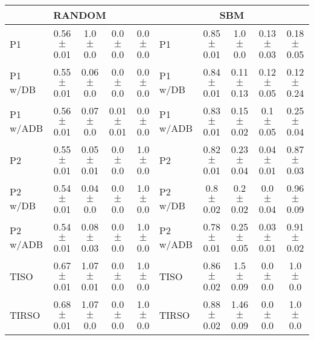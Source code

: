\begin{table*}[htbp]
\begin{tabular}{lcccc|lcccc}
\midrule
\multicolumn{5}{c}{\textbf{RANDOM}} & \multicolumn{5}{c}{\textbf{SBM}} \\
\midrule
P1 & 0.56{\tiny$\pm$0.01} & 1.0{\tiny$\pm$0.0} & 0.0{\tiny$\pm$0.0} & 0.0{\tiny$\pm$0.0}  & P1 & 0.85{\tiny$\pm$0.01} & 1.0{\tiny$\pm$0.0} & 0.13{\tiny$\pm$0.03} & 0.18{\tiny$\pm$0.05}  \\
P1 w/DB & 0.55{\tiny$\pm$0.01} & 0.06{\tiny$\pm$0.0} & 0.0{\tiny$\pm$0.0} & 0.0{\tiny$\pm$0.0}  & P1 w/DB & 0.84{\tiny$\pm$0.01} & 0.11{\tiny$\pm$0.13} & 0.12{\tiny$\pm$0.05} & 0.12{\tiny$\pm$0.24}  \\
P1 w/ADB & 0.56{\tiny$\pm$0.01} & 0.07{\tiny$\pm$0.0} & 0.01{\tiny$\pm$0.01} & 0.0{\tiny$\pm$0.0}  & P1 w/ADB & 0.83{\tiny$\pm$0.01} & 0.15{\tiny$\pm$0.02} & 0.1{\tiny$\pm$0.05} & 0.25{\tiny$\pm$0.04}  \\
P2 & 0.55{\tiny$\pm$0.01} & 0.05{\tiny$\pm$0.01} & 0.0{\tiny$\pm$0.0} & 1.0{\tiny$\pm$0.0}  & P2 & 0.82{\tiny$\pm$0.01} & 0.23{\tiny$\pm$0.04} & 0.04{\tiny$\pm$0.01} & 0.87{\tiny$\pm$0.03}  \\
P2 w/DB & 0.54{\tiny$\pm$0.01} & 0.04{\tiny$\pm$0.0} & 0.0{\tiny$\pm$0.0} & 1.0{\tiny$\pm$0.0}  & P2 w/DB & 0.8{\tiny$\pm$0.02} & 0.2{\tiny$\pm$0.02} & 0.0{\tiny$\pm$0.04} & 0.96{\tiny$\pm$0.09}  \\
P2 w/ADB & 0.54{\tiny$\pm$0.01} & 0.08{\tiny$\pm$0.03} & 0.0{\tiny$\pm$0.0} & 1.0{\tiny$\pm$0.0}  & P2 w/ADB & 0.78{\tiny$\pm$0.01} & 0.25{\tiny$\pm$0.05} & 0.03{\tiny$\pm$0.01} & 0.91{\tiny$\pm$0.02}  \\
TISO & 0.67{\tiny$\pm$0.01} & 1.07{\tiny$\pm$0.01} & 0.0{\tiny$\pm$0.0} & 1.0{\tiny$\pm$0.0}  & TISO & 0.86{\tiny$\pm$0.02} & 1.5{\tiny$\pm$0.09} & 0.0{\tiny$\pm$0.0} & 1.0{\tiny$\pm$0.0}  \\
TIRSO & 0.68{\tiny$\pm$0.01} & 1.07{\tiny$\pm$0.0} & 0.0{\tiny$\pm$0.0} & 1.0{\tiny$\pm$0.0}  & TIRSO & 0.88{\tiny$\pm$0.02} & 1.46{\tiny$\pm$0.09} & 0.0{\tiny$\pm$0.0} & 1.0{\tiny$\pm$0.0}  \\
\bottomrule
\end{tabular}
\end{table*}